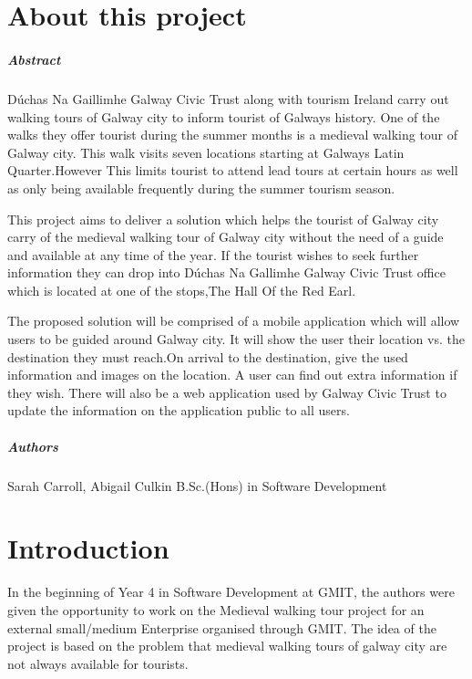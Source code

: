 
\chapter*{About this project}
\paragraph{Abstract}

Dúchas Na Gaillimhe Galway Civic Trust along with tourism Ireland carry out walking tours of Galway city to inform tourist of Galways history. One of the walks they offer tourist during the summer months is a medieval walking tour of Galway city. This walk visits seven locations starting at Galways Latin Quarter.However This limits tourist to attend lead tours at certain hours as well as only being available frequently during the summer tourism season.

This project aims to deliver a solution which helps the tourist of Galway city carry of the medieval walking tour of Galway city without the 
need of a guide and available at any time of the year. If the tourist wishes to seek further information they can drop into Dúchas Na Gallimhe Galway Civic Trust office which is located at one of the stops,The Hall Of the Red Earl.

The proposed solution will be comprised of a mobile application which will allow users to be guided around Galway city. It will show the user their location vs. the destination they must reach.On arrival to the destination, give the used information and images on the location. A user can find out extra information if they wish. There will also be a web application used by Galway Civic Trust to update the information on the application public to all users.

\paragraph{Authors}
Sarah Carroll, Abigail Culkin
B.Sc.(Hons) in Software Development

\chapter{Introduction}

In the beginning of Year 4 in Software Development at GMIT, the authors were given the opportunity to work on the Medieval walking tour project for an external small/medium Enterprise organised through GMIT. The idea of the project is based on the problem that medieval walking tours of galway city are not always available for tourists. 


